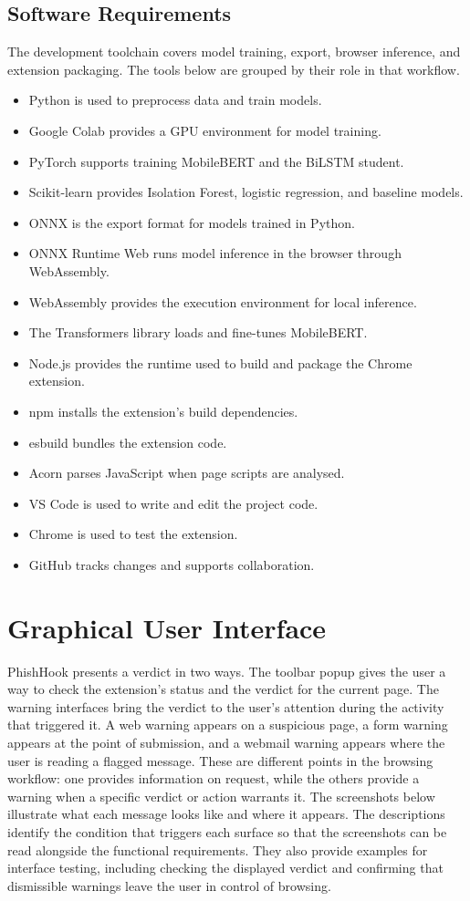 \documentclass{FastFyp}
\begin{document}
\subsection{Software Requirements}
The development toolchain covers model training, export, browser inference, and extension packaging. The tools below are grouped by their role in that workflow.
\begin{itemize}
    \item Python is used to preprocess data and train models.
    \item Google Colab provides a GPU environment for model training.
    \item PyTorch supports training MobileBERT and the BiLSTM student.
    \item Scikit-learn provides Isolation Forest, logistic regression, and baseline models.
    \item ONNX is the export format for models trained in Python.
    \item ONNX Runtime Web runs model inference in the browser through WebAssembly.
    \item WebAssembly provides the execution environment for local inference.
    \item The Transformers library loads and fine-tunes MobileBERT.
    \item Node.js provides the runtime used to build and package the Chrome extension.
    \item npm installs the extension's build dependencies.
    \item esbuild bundles the extension code.
    \item Acorn parses JavaScript when page scripts are analysed.
    \item VS Code is used to write and edit the project code.
    \item Chrome is used to test the extension.
    \item GitHub tracks changes and supports collaboration.
\end{itemize}

\section{Graphical User Interface}
PhishHook presents a verdict in two ways. The toolbar popup gives the user a way to check the extension's status and the verdict for the current page. The warning interfaces bring the verdict to the user's attention during the activity that triggered it. A web warning appears on a suspicious page, a form warning appears at the point of submission, and a webmail warning appears where the user is reading a flagged message. These are different points in the browsing workflow: one provides information on request, while the others provide a warning when a specific verdict or action warrants it. The screenshots below illustrate what each message looks like and where it appears. The descriptions identify the condition that triggers each surface so that the screenshots can be read alongside the functional requirements. They also provide examples for interface testing, including checking the displayed verdict and confirming that dismissible warnings leave the user in control of browsing.
\end{document}
